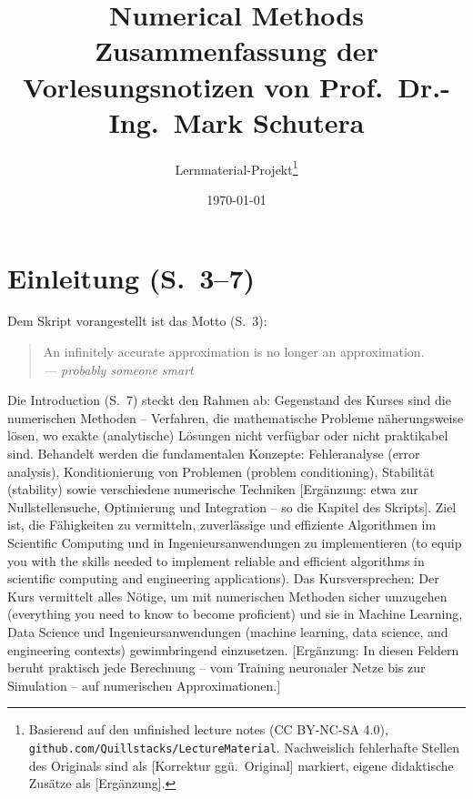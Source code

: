 \documentclass[11pt,a4paper]{scrartcl}
\title{Numerical Methods\\\large Zusammenfassung der Vorlesungsnotizen von Prof.\ Dr.-Ing.\ Mark Schutera}
\author{Lernmaterial-Projekt\thanks{Basierend auf den \glqq unfinished lecture notes\grqq{} (CC BY-NC-SA 4.0), \texttt{github.com/Quillstacks/LectureMaterial}. Nachweislich fehlerhafte Stellen des Originals sind als [Korrektur ggü.\ Original] markiert, eigene didaktische Zusätze als [Ergänzung].}}
\date{\today}
\begin{document}
\maketitle
\tableofcontents
\newpage

\section*{Einleitung (S.~3--7)}

Dem Skript vorangestellt ist das Motto (S.~3):
\begin{quote}
\glqq An infinitely accurate approximation is no longer an approximation.\grqq\\
\emph{--- probably someone smart}
\end{quote}

Die Introduction (S.~7) steckt den Rahmen ab: Gegenstand des Kurses sind die numerischen Methoden -- Verfahren, die mathematische Probleme näherungsweise lösen, wo exakte (analytische) Lösungen nicht verfügbar oder nicht praktikabel sind. Behandelt werden die fundamentalen Konzepte: Fehleranalyse (error analysis), Konditionierung von Problemen (problem conditioning), Stabilität (stability) sowie verschiedene numerische Techniken [Ergänzung: etwa zur Nullstellensuche, Optimierung und Integration -- so die Kapitel des Skripts]. Ziel ist, die Fähigkeiten zu vermitteln, zuverlässige und effiziente Algorithmen im Scientific Computing und in Ingenieursanwendungen zu implementieren (\glqq to equip you with the skills needed to implement reliable and efficient algorithms in scientific computing and engineering applications\grqq). Das Kursversprechen: Der Kurs vermittelt alles Nötige, um mit numerischen Methoden sicher umzugehen (\glqq everything you need to know to become proficient\grqq) und sie in Machine Learning, Data Science und Ingenieursanwendungen (machine learning, data science, and engineering contexts) gewinnbringend einzusetzen. [Ergänzung: In diesen Feldern beruht praktisch jede Berechnung -- vom Training neuronaler Netze bis zur Simulation -- auf numerischen Approximationen.]







\end{document}
